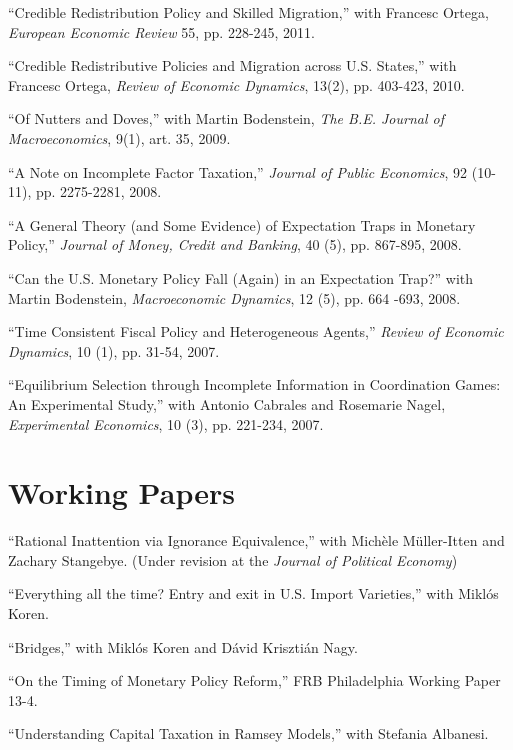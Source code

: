 \documentclass[letterpaper, 12pt]{article}
\renewenvironment{itemize}{
  \begin{list}{}{
    \setlength{\leftmargin}{2em}
  }
}{
  \end{list}
}
\begin{document}
\begin{itemize}
\item ``Credible Redistribution Policy and Skilled Migration,'' with Francesc Ortega, {\it European Economic Review} 55, pp. 228-245, 2011.

\item ``Credible Redistributive Policies and Migration across U.S. States,'' with Francesc Ortega, {\it Review of Economic Dynamics}, 13(2), pp. 403-423, 2010.

\item ``Of Nutters and Doves,'' with Martin Bodenstein, {\it The B.E. Journal of Macroeconomics}, 9(1), art. 35, 2009.
 
\item ``A Note on Incomplete Factor Taxation,'' {\it Journal of Public Economics}, 92 (10-11), pp. 2275-2281, 2008.

\item ``A General Theory (and Some Evidence) of Expectation Traps in Monetary Policy,'' {\it Journal of Money, Credit and Banking}, 40 (5), pp. 867-895, 2008. 

\item ``Can the U.S. Monetary Policy Fall (Again) in an Expectation Trap?'' with Martin Bodenstein, {\it Macroeconomic Dynamics}, 12 (5), pp. 664 -693, 2008.

\item ``Time Consistent Fiscal Policy and Heterogeneous Agents,'' {\it Review of Economic Dynamics}, 10 (1), pp. 31-54, 2007.

\item ``Equilibrium Selection through Incomplete Information in Coordination Games: An Experimental Study,'' with Antonio Cabrales and Rosemarie Nagel, {\it Experimental Economics}, 10 (3), pp. 221-234, 2007.

\end{itemize}

\section*{Working Papers}

\begin{itemize}
  \item ``Rational Inattention via Ignorance Equivalence,'' with Mich\`ele M\"uller-Itten and Zachary Stangebye. (Under revision at the \textit{Journal of Political Economy})
  \item ``Everything all the time? Entry and exit in U.S. Import Varieties,'' with Mikl\'os Koren.
  \item ``Bridges,'' with Mikl\'os Koren and D\'avid Kriszti\'an Nagy.
  \item ``On the Timing of Monetary Policy Reform,'' FRB Philadelphia Working Paper 13-4.
  \item ``Understanding Capital Taxation in Ramsey Models,'' with Stefania Albanesi.
\end{itemize}
\end{document}

